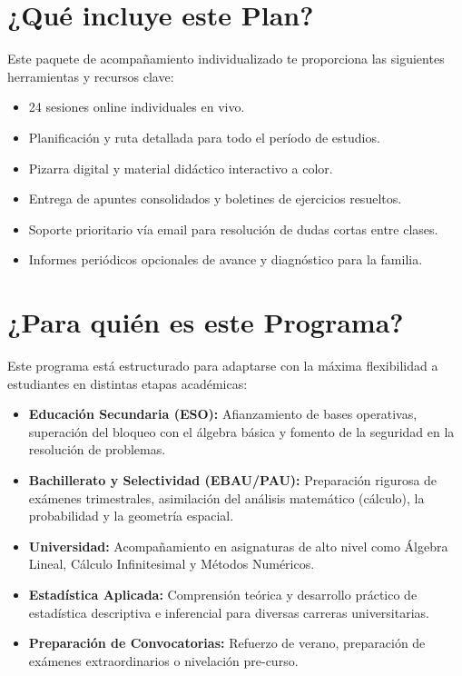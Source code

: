 \documentclass[11pt,a4paper]{article}
\begin{document}
\section{¿Qué incluye este Plan?}
Este paquete de acompañamiento individualizado te proporciona las siguientes herramientas y recursos clave:
\begin{itemize}
    \item 24 sesiones online individuales en vivo.
    \item Planificación y ruta detallada para todo el período de estudios.
    \item Pizarra digital y material didáctico interactivo a color.
    \item Entrega de apuntes consolidados y boletines de ejercicios resueltos.
    \item Soporte prioritario vía email para resolución de dudas cortas entre clases.
    \item Informes periódicos opcionales de avance y diagnóstico para la familia.
\end{itemize}

\section{¿Para quién es este Programa?}
Este programa está estructurado para adaptarse con la máxima flexibilidad a estudiantes en distintas etapas académicas:
\begin{itemize}
    \item \textbf{Educación Secundaria (ESO):} Afianzamiento de bases operativas, superación del bloqueo con el álgebra básica y fomento de la seguridad en la resolución de problemas.
    \item \textbf{Bachillerato y Selectividad (EBAU/PAU):} Preparación rigurosa de exámenes trimestrales, asimilación del análisis matemático (cálculo), la probabilidad y la geometría espacial.
    \item \textbf{Universidad:} Acompañamiento en asignaturas de alto nivel como Álgebra Lineal, Cálculo Infinitesimal y Métodos Numéricos.
    \item \textbf{Estadística Aplicada:} Comprensión teórica y desarrollo práctico de estadística descriptiva e inferencial para diversas carreras universitarias.
    \item \textbf{Preparación de Convocatorias:} Refuerzo de verano, preparación de exámenes extraordinarios o nivelación pre-curso.
\end{itemize}
\end{document}
